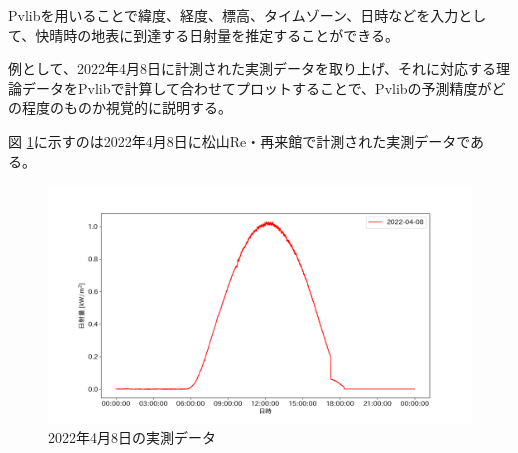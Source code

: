 \documentclass[a4j,12pt,]{jarticle}
\begin{document}
Pvlibを用いることで緯度、経度、標高、タイムゾーン、日時などを入力として、快晴時の地表に到達する日射量を推定することができる。

例として、2022年4月8日に計測された実測データを取り上げ、それに対応する理論データをPvlibで計算して合わせてプロットすることで、Pvlibの予測精度がどの程度のものか視覚的に説明する。




図 \ref{p2}に示すのは2022年4月8日に松山Re・再来館で計測された実測データである。

\begin{figure}[H]
  \begin{center}
    \includegraphics[width=160mm]{real.png}
    \caption{2022年4月8日の実測データ}
    \label{p2}
  \end{center}
\end{figure}
\end{document}
